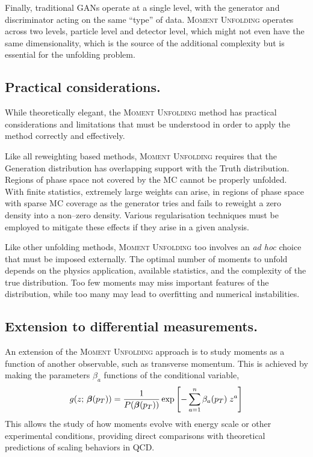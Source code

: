         Finally, traditional GANs operate at a single level, with the generator and discriminator acting on the same ``type'' of data.
        \textsc{Moment Unfolding} operates across two levels, particle level and detector level, which might not even have the same dimensionality, which is the source of the additional complexity but is essential for the unfolding problem.
        
    \subsection{Practical considerations.}
        While theoretically elegant, the \textsc{Moment Unfolding} method has practical considerations and limitations that must be understood in order to apply the method correctly and effectively.

        Like all reweighting based methods, \textsc{Moment Unfolding} requires that the Generation distribution has overlapping support with the Truth distribution.
        Regions of phase space not covered by the MC cannot be properly unfolded.
        With finite statistics, extremely large weights can arise, in regions of phase space with sparse MC coverage as the generator tries and fails to reweight a zero density into a non--zero density.
        Various regularisation techniques must be employed to mitigate these effects if they arise in a given analysis.
        
        Like other unfolding methods, \textsc{Moment Unfolding} too involves an \textit{ad hoc} choice that must be imposed externally.
        The optimal number of moments to unfold depends on the physics application, available statistics, and the complexity of the true distribution.
        Too few moments may miss important features of the distribution, while too many may lead to overfitting and numerical instabilities.
    \subsection{Extension to differential measurements.}
        An extension of the \textsc{Moment Unfolding} approach is to study moments as a function of another observable, such as transverse momentum.
        This is achieved by making the parameters $\beta_a$ functions of the conditional variable,
        \[
            \label{eq:pt-moment-gen}
            g(z;\,\vb*\beta\qty(p_T)) = \frac{1}{P\qty(\vb*{\beta}\qty(p_T))} \exp\left[-\sum_{a=1}^n \beta_a(p_T)\; z^a\right]
        \]
        This allows the study of how moments evolve with energy scale or other experimental conditions, providing direct comparisons with theoretical predictions of scaling behaviors in QCD.

